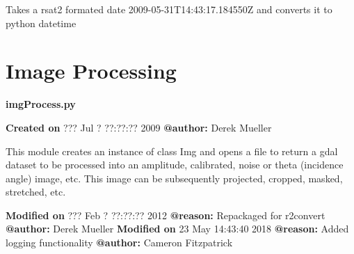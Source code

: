 \documentclass[letterpaper,10pt,english]{sphinxmanual}
\begin{document}
\begin{fulllineitems}
\label{code:Metadata.readdate}
Takes a rsat2 formated date 2009-05-31T14:43:17.184550Z
and converts it to python datetime

\end{fulllineitems}



\section{Image Processing}
\label{code:image-processing}\label{code:module-Image}
\textbf{imgProcess.py}

\textbf{Created on} ??? Jul  ? ??:??:?? 2009 \textbf{@author:} Derek Mueller

This module creates an instance of class Img and opens a file to return a
gdal dataset to be processed into an amplitude, calibrated, noise or theta
(incidence angle) image, etc. This image can be subsequently projected,
cropped, masked, stretched, etc.

\textbf{Modified on} ??? Feb  ? ??:??:?? 2012 \textbf{@reason:} Repackaged for r2convert \textbf{@author:} Derek Mueller
\textbf{Modified on} 23 May 14:43:40 2018 \textbf{@reason:} Added logging functionality \textbf{@author:} Cameron Fitzpatrick
\end{document}

